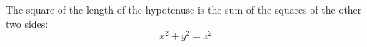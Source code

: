 \begin{theorem}
The square of the length of the hypotenuse is the sum of the squares of the other two sides:
\[
x^2 + y^2 = z^2
\]
\end{theorem}